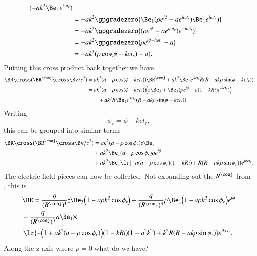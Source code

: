 {\begin{equation}
\begin{aligned}
(-a k^2 \Be_1 e^{i \omega t_r} )  \\
&=
- a k^2 \gpgradezero{
\Be_1 (\rho e^{i \phi} - a e^{i \omega t_r} )
\Be_1 e^{i \omega t_r} )
} \\
&=
- a k^2 \gpgradezero{
(\rho e^{i \phi} - a e^{i \omega t_r} )
e^{-i \omega t_r} )
} \\
&=
- a k^2 \gpgradezero{
\rho e^{i \phi - i \omega t_r} - a
} \\
&=
- a k^2 ( \rho \cos(\phi - k c t_r) - a ).
\end{aligned}
\end{equation}
%
Putting this cross product back together we have
%
\begin{equation}\label{eqn:relativisticElectrodynamicsExamReflection:1150}
\begin{aligned}
\BR \cross (\BR^\conj \cross \dot{\Bv}/c^2)
&=
a k^2 ( a -\rho \cos(\phi - k c t_r) ) \BR^\conj
+a k^2 \Be_1 e^{i k c  t_r} R(R - a k \rho \sin(\phi - k c t_r)) \\
&=
a k^2 ( a -\rho \cos(\phi - k c t_r) ) \Bigl(
z \Be_3 + \Be_1 (\rho e^{i \phi} - a (1 - k R i) e^{i k c t_r} )
\Bigr) \\
&\qquad +a k^2 R \Be_1 e^{i k c  t_r} (R - a k \rho \sin(\phi - k c t_r)).
\end{aligned}
\end{equation}
%
Writing
%
\begin{equation}\label{eqn:relativisticElectrodynamicsExamReflection:640}
\phi_r = \phi - k c t_r,
\end{equation}
%
this can be grouped into similar terms
%
\begin{equation}\label{eqn:relativisticElectrodynamicsExamReflection:660}
\begin{aligned}
\BR \cross (\BR^\conj \cross \dot{\Bv}/c^2)
&=
a k^2
(a - \rho \cos\phi_r) z \Be_3 \\
&+
a k^2
\Be_1
(a - \rho \cos\phi_r) \rho e^{i\phi} \\
&+
a k^2
\Be_1
\lr{
   -a (a - \rho \cos\phi_r) (1 - k R i)
   + R(R - a k \rho \sin \phi_r)
} e^{i k c t_r}.
\end{aligned}
\end{equation}
%
The electric field pieces can now be collected.  Not expanding out the \(R^\conj\) from , this is
%
\begin{equation}\label{eqn:relativisticElectrodynamicsExamReflection:700}
\begin{aligned}
&\BE =
\frac{q}{(R^\conj)^3} z \Be_3
\Bigl( 1 - a \rho k^2 \cos\phi_r \Bigr) 
+
\frac{q}{(R^\conj)^3} \rho
\Be_1 \Bigl(1 - a \rho k^2 \cos\phi_r \Bigr) e^{i\phi} \\
&+
\frac{q}{(R^\conj)^3} a \Be_1 \times \\
&\,
\lr{
   -\Bigl( 1 + a k^2 (a - \rho \cos\phi_r) \Bigr) (1 - k R i)(1 - a^2 k^2)
   + k^2 R(R - a k \rho \sin \phi_r)
} e^{i k c t_r}.
\end{aligned}
\end{equation}
%
Along the z-axis where \(\rho = 0\) what do we have?

}
